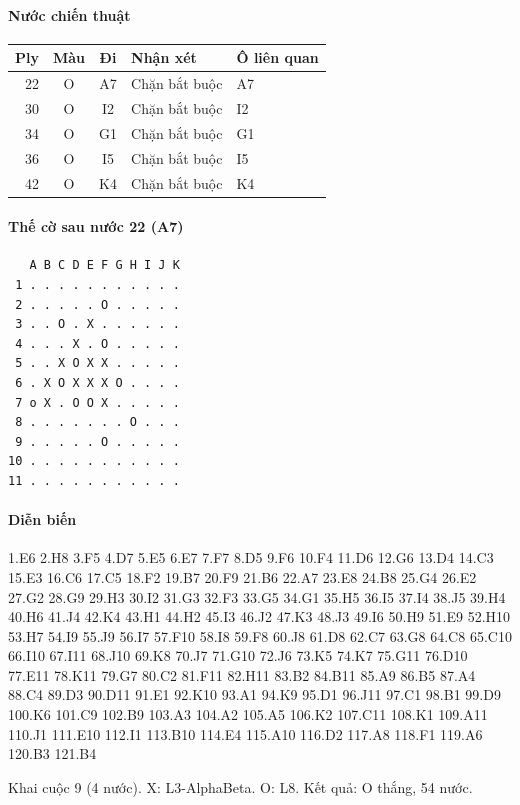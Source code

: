 \paragraph{Nước chiến thuật}
\begin{center}\small
\begin{tabular}{@{}rccll@{}}
\toprule
Ply & Màu & Đi & Nhận xét & Ô liên quan \\
\midrule
22 & O & A7 & Chặn bắt buộc & A7 \\
30 & O & I2 & Chặn bắt buộc & I2 \\
34 & O & G1 & Chặn bắt buộc & G1 \\
36 & O & I5 & Chặn bắt buộc & I5 \\
42 & O & K4 & Chặn bắt buộc & K4 \\
\bottomrule
\end{tabular}
\end{center}
\paragraph{Thế cờ sau nước 22 (A7)}
\begin{verbatim}
   A B C D E F G H I J K
 1 . . . . . . . . . . .
 2 . . . . . O . . . . .
 3 . . O . X . . . . . .
 4 . . . X . O . . . . .
 5 . . X O X X . . . . .
 6 . X O X X X O . . . .
 7 o X . O O X . . . . .
 8 . . . . . . . O . . .
 9 . . . . . O . . . . .
10 . . . . . . . . . . .
11 . . . . . . . . . . .
\end{verbatim}
\paragraph{Diễn biến}
{\footnotesize 1.E6 2.H8 3.F5 4.D7 5.E5 6.E7 7.F7 8.D5 9.F6 10.F4 11.D6 12.G6 13.D4 14.C3 15.E3 16.C6 17.C5 18.F2 19.B7 20.F9 21.B6 22.A7 23.E8 24.B8 25.G4 26.E2 27.G2 28.G9 29.H3 30.I2 31.G3 32.F3 33.G5 34.G1 35.H5 36.I5 37.I4 38.J5 39.H4 40.H6 41.J4 42.K4 43.H1 44.H2 45.I3 46.J2 47.K3 48.J3 49.I6 50.H9 51.E9 52.H10 53.H7 54.I9 55.J9 56.I7 57.F10 58.I8 59.F8 60.J8 61.D8 62.C7 63.G8 64.C8 65.C10 66.I10 67.I11 68.J10 69.K8 70.J7 71.G10 72.J6 73.K5 74.K7 75.G11 76.D10 77.E11 78.K11 79.G7 80.C2 81.F11 82.H11 83.B2 84.B11 85.A9 86.B5 87.A4 88.C4 89.D3 90.D11 91.E1 92.K10 93.A1 94.K9 95.D1 96.J11 97.C1 98.B1 99.D9 100.K6 101.C9 102.B9 103.A3 104.A2 105.A5 106.K2 107.C11 108.K1 109.A11 110.J1 111.E10 112.I1 113.B10 114.E4 115.A10 116.D2 117.A8 118.F1 119.A6 120.B3 121.B4\par}
Khai cuộc 9 (4 nước). X: L3-AlphaBeta. O: L8. Kết quả: O thắng, 54 nước.

